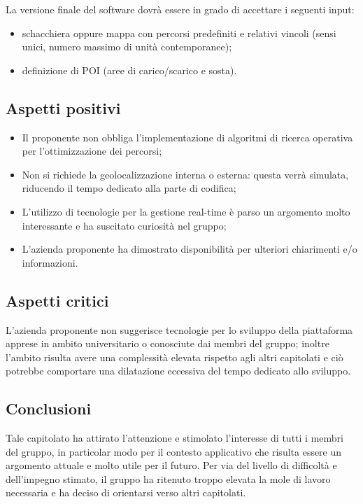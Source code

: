 La versione finale del software dovrà essere in grado di accettare i seguenti input:
\begin{itemize}
\item schacchiera oppure mappa con percorsi predefiniti e relativi vincoli (sensi unici, numero massimo di unità contemporanee);
\item definizione di POI (aree di carico/scarico e sosta).
\end{itemize}

\subsection{Aspetti positivi}
\begin{itemize}
\item Il proponente non obbliga l'implementazione di algoritmi di ricerca operativa per l'ottimizzazione dei percorsi;
\item Non si richiede la geolocalizzazione interna o esterna: questa verrà simulata, riducendo il tempo dedicato alla parte di codifica;
\item L'utilizzo di tecnologie per la gestione real-time è parso un argomento molto interessante e ha suscitato curiosità nel gruppo;
\item L'azienda proponente ha dimostrato disponibilità per ulteriori chiarimenti e/o  informazioni.
\end{itemize}

\subsection{Aspetti critici}
L'azienda proponente non suggerisce tecnologie per lo sviluppo della piattaforma apprese in ambito universitario o conosciute dai membri del gruppo; inoltre l'ambito risulta avere una complessità elevata rispetto agli altri capitolati e ciò potrebbe comportare una dilatazione eccessiva del tempo dedicato allo sviluppo.

\subsection{Conclusioni}
Tale capitolato ha attirato l'attenzione e stimolato l'interesse di tutti i membri del gruppo, in particolar modo per il contesto applicativo che risulta essere un argomento attuale e molto utile per il futuro.
Per via del livello di difficoltà e dell'impegno stimato, il gruppo ha ritenuto troppo elevata la mole di lavoro necessaria e ha deciso di orientarsi verso altri capitolati. 

